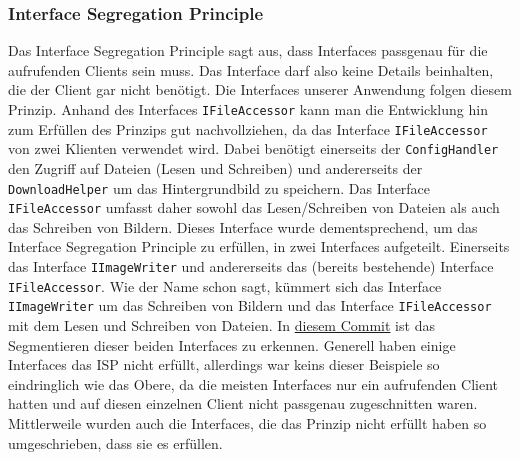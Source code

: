 \subsubsection{Interface Segregation Principle}
Das Interface Segregation Principle sagt aus, dass Interfaces passgenau für die aufrufenden Clients sein muss. Das Interface darf also keine Details beinhalten, die der Client gar nicht benötigt.
Die Interfaces unserer Anwendung folgen diesem Prinzip. Anhand des Interfaces \texttt{IFileAccessor} kann man die Entwicklung hin zum Erfüllen des Prinzips gut nachvollziehen, da das Interface \texttt{IFileAccessor} von zwei Klienten verwendet wird. Dabei benötigt einerseits der \texttt{ConfigHandler} den Zugriff auf Dateien (Lesen und Schreiben) und andererseits der \texttt{DownloadHelper} um das Hintergrundbild zu speichern. Das Interface \texttt{IFileAccessor} umfasst daher sowohl das Lesen/Schreiben von Dateien als auch das Schreiben von Bildern. Dieses Interface wurde dementsprechend, um das Interface Segregation Principle zu erfüllen, in zwei Interfaces aufgeteilt. Einerseits das Interface \texttt{IImageWriter} und andererseits das (bereits bestehende) Interface \texttt{IFileAccessor}. Wie der Name schon sagt, kümmert sich das Interface \texttt{IImageWriter} um das Schreiben von Bildern und das Interface \texttt{IFileAccessor} mit dem Lesen und Schreiben von Dateien. In \href{https://github.com/Bronzila/WeatherWallpaper/commit/8db38466c2185e16ef90f71af485e00b57b09032}{\color{blue}diesem Commit} ist das Segmentieren dieser beiden Interfaces zu erkennen.
Generell haben einige Interfaces das ISP nicht erfüllt, allerdings war keins dieser Beispiele so eindringlich wie das Obere, da die meisten Interfaces nur ein aufrufenden Client hatten und auf diesen einzelnen Client nicht passgenau zugeschnitten waren. Mittlerweile wurden auch die Interfaces, die das Prinzip nicht erfüllt haben so umgeschrieben, dass sie es erfüllen.
